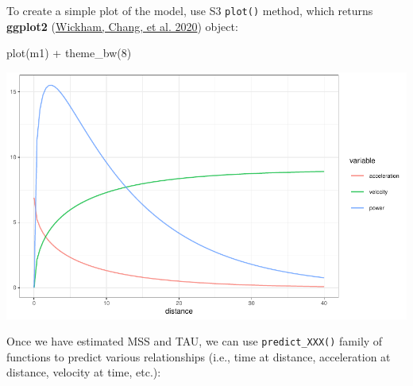 \documentclass[fleqn,10pt,lineno]{wlpeerj} %
\newenvironment{Shaded}{\begin{snugshade}}{\end{snugshade}}
\newcommand{\AttributeTok}[1]{\textcolor[rgb]{0.77,0.63,0.00}{#1}}
\newcommand{\CommentTok}[1]{\textcolor[rgb]{0.56,0.35,0.01}{\textit{#1}}}
\newcommand{\DecValTok}[1]{\textcolor[rgb]{0.00,0.00,0.81}{#1}}
\newcommand{\FunctionTok}[1]{\textcolor[rgb]{0.00,0.00,0.00}{#1}}
\newcommand{\NormalTok}[1]{#1}
\newcommand{\SpecialCharTok}[1]{\textcolor[rgb]{0.00,0.00,0.00}{#1}}
\begin{document}
To create a simple plot of the model, use S3 \texttt{plot()} method, which returns \textbf{ggplot2} (\protect\hyperlink{ref-R-ggplot2}{Wickham, Chang, et al. 2020}) object:

\begin{Shaded}
\begin{Highlighting}[]
\FunctionTok{plot}\NormalTok{(m1) }\SpecialCharTok{+} \FunctionTok{theme\_bw}\NormalTok{(}\DecValTok{8}\NormalTok{)}
\end{Highlighting}
\end{Shaded}

\begin{center}\includegraphics[width=1\linewidth]{paper_files/figure-latex/unnamed-chunk-4-1} \end{center}

Once we have estimated MSS and TAU, we can use \texttt{predict\_XXX()} family of functions to predict various relationships (i.e., time at distance, acceleration at distance, velocity at time, etc.):

\begin{Shaded}
\end{Shaded}
\end{document}
